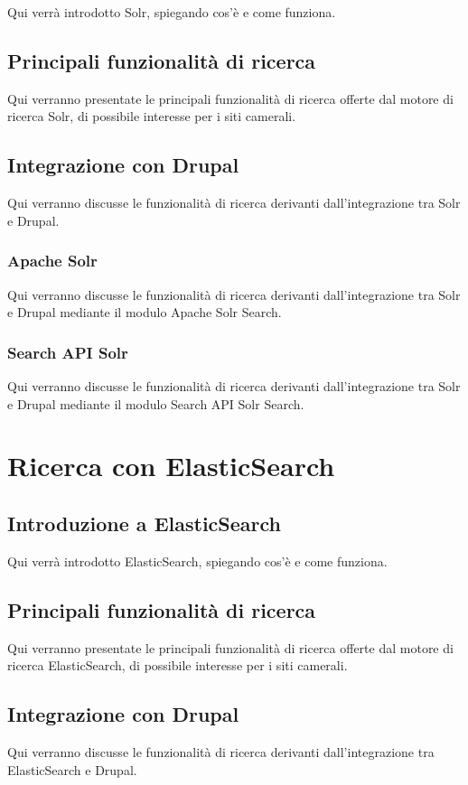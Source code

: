 		Qui verrà introdotto Solr, spiegando cos'è e come funziona.
		
		\subsection{Principali funzionalità di ricerca}
		Qui verranno presentate le principali funzionalità di ricerca offerte dal motore di ricerca Solr, di possibile interesse per i siti camerali.
			
		\subsection{Integrazione con Drupal}
		Qui verranno discusse le funzionalità di ricerca derivanti dall'integrazione tra Solr e Drupal.
			
			\subsubsection{Apache Solr}
			Qui verranno discusse le funzionalità di ricerca derivanti dall'integrazione tra Solr e Drupal mediante il modulo Apache Solr Search.
			
			\subsubsection{Search API Solr}
			Qui verranno discusse le funzionalità di ricerca derivanti dall'integrazione tra Solr e Drupal mediante il modulo Search API Solr Search.
	
	\section{Ricerca con ElasticSearch}
	
		\subsection{Introduzione a ElasticSearch}
		Qui verrà introdotto ElasticSearch, spiegando cos'è e come funziona.

		\subsection{Principali funzionalità di ricerca}
		Qui verranno presentate le principali funzionalità di ricerca offerte dal motore di ricerca ElasticSearch, di possibile interesse per i siti camerali.
		
		\subsection{Integrazione con Drupal}
		Qui verranno discusse le funzionalità di ricerca derivanti dall'integrazione tra ElasticSearch e Drupal.
		
